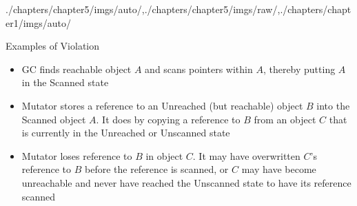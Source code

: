 \begin{graphicspathcontext}{{./chapters/chapter5/imgs/auto/},{./chapters/chapter5/imgs/raw/},{./chapters/chapter1/imgs/auto/}}
\begin{bibunit}[apalike]
\begin{frame}[t]{Examples of Violation}
	\begin{small}
		\begin{itemize}
			\item<1> GC finds reachable object $A$ and scans pointers within $A$, thereby putting $A$ in the Scanned state
			\item<2> Mutator stores a reference to an Unreached (but reachable) object $B$ into the Scanned object $A$. It does by copying a reference to $B$ from an object $C$ that is currently in the Unreached or Unscanned state
			\item<3> Mutator loses reference to $B$ in object $C$. It may have overwritten $C$'s reference to $B$ before the reference is scanned, or $C$ may have become unreachable and never have reached the Unscanned state to have its reference scanned
		\end{itemize}
	\end{small}
	\vspace{.5cm}
	\begin{center}
	\end{center}
\end{frame}


\end{bibunit}
\end{graphicspathcontext}
